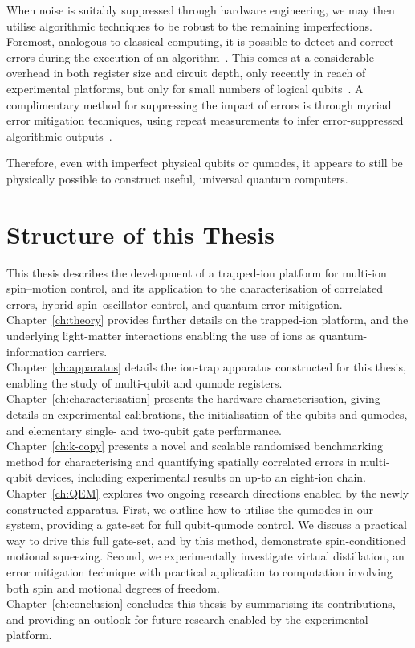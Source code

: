 When noise is suitably suppressed
through hardware engineering, we may then utilise algorithmic techniques to be
robust to the remaining imperfections. Foremost, analogous to classical
computing, it is possible to detect and correct errors during the execution of
an algorithm~\cite{aharonov_fault-tolerant_2006}. This comes at a considerable
overhead in both register size and circuit depth, only recently in reach of
experimental platforms, but only for small numbers of logical qubits~\cite{steane_overhead_2003}. A
complimentary method for suppressing the impact of errors is through myriad
error mitigation techniques, using repeat measurements to infer error-suppressed
algorithmic outputs~\cite{cai_quantum_2023}. 

Therefore, even with imperfect physical qubits or qumodes, it appears to still be physically possible to construct useful, universal quantum computers.


\section{Structure of this Thesis}

    This thesis describes the development of a trapped-ion platform for
    multi-ion spin–motion control, and its application to the characterisation
    of correlated errors, hybrid spin–oscillator control, and quantum error
    mitigation.\\

    \noindent Chapter~\ref{ch:theory} provides further details on the trapped-ion platform, and the underlying light-matter interactions enabling the use of ions as quantum-information carriers. \\
    Chapter~\ref{ch:apparatus} details the ion-trap 
    apparatus constructed for this thesis, enabling the study of multi-qubit and
    qumode registers.\\
    Chapter~\ref{ch:characterisation} presents the hardware characterisation, giving details on experimental calibrations, the initialisation of the qubits and qumodes, and elementary single- and two-qubit gate performance. \\
    Chapter~\ref{ch:k-copy} presents a novel and scalable randomised benchmarking method
    for characterising and quantifying spatially correlated errors in multi-qubit
    devices, including experimental results on up-to an eight-ion chain.\\
    Chapter~\ref{ch:QEM} explores two ongoing research directions enabled by the
    newly constructed apparatus. First, we outline how to utilise the qumodes in our system, providing a gate-set for full qubit-qumode control. We discuss a practical way to drive this full gate-set, and by this method, demonstrate spin-conditioned motional squeezing. Second, we experimentally investigate virtual distillation, an error mitigation technique with
    practical application to computation involving both spin and motional
    degrees of freedom.\\ 
    Chapter~\ref{ch:conclusion} concludes this thesis by summarising its contributions, and providing an outlook for future research enabled by the experimental platform.\\
